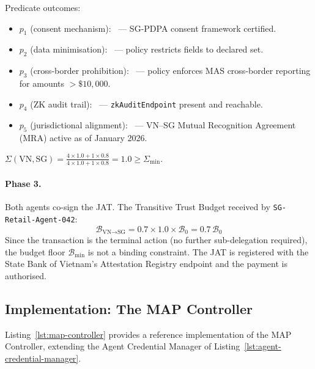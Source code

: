 Predicate outcomes:
\begin{itemize}
  \item $p_1$ (consent mechanism): \checkmark\ — SG-PDPA consent
        framework certified.
  \item $p_2$ (data minimisation): \checkmark\ — policy restricts
        fields to declared set.
  \item $p_3$ (cross-border prohibition): \checkmark\ — policy enforces
        MAS cross-border reporting for amounts $> \$10{,}000$.
  \item $p_4$ (ZK audit trail): \checkmark\ — \texttt{zkAuditEndpoint}
        present and reachable.
  \item $p_5$ (jurisdictional alignment): \checkmark\ — VN--SG Mutual
        Recognition Agreement (MRA) active as of January 2026.
\end{itemize}

$\Sigma(\text{VN}, \text{SG}) = \frac{4 \times 1.0 + 1 \times 0.8}
{4 \times 1.0 + 1 \times 0.8} = 1.0 \geq \Sigma_{\min}$.

\paragraph{Phase 3.}
Both agents co-sign the JAT.  The Transitive Trust Budget received by
\texttt{SG-Retail-Agent-042}:
\begin{equation*}
\mathcal{B}_{\text{VN} \to \text{SG}} = 0.7 \times 1.0 \times
\mathcal{B}_0 = 0.7\,\mathcal{B}_0
\end{equation*}
Since the transaction is the terminal action (no further sub-delegation
required), the budget floor $\mathcal{B}_{\min}$ is not a binding
constraint.  The JAT is registered with the State Bank of Vietnam's
Attestation Registry endpoint and the payment is authorised.

\subsection{Implementation: The MAP Controller}
\label{sec:map-implementation}

Listing~\ref{lst:map-controller} provides a reference implementation of
the MAP Controller, extending the Agent Credential Manager of
Listing~\ref{lst:agent-credential-manager}.

